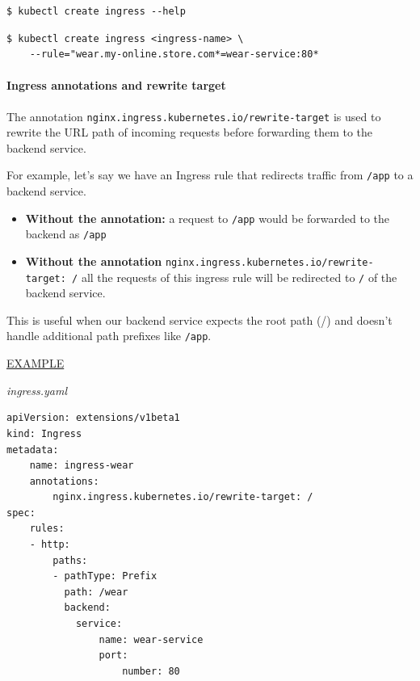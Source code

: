 \documentclass{article}
\newenvironment{codetemplate}[1][]{%
  \mybasecolorbox[#1]
  \itshape
}{%
  \endmybasecolorbox
}
\begin{document}
\begin{codetemplate}{}
\begin{verbatim}
$ kubectl create ingress --help
\end{verbatim}
\end{codetemplate}

\begin{codetemplate}{}
\begin{verbatim}
$ kubectl create ingress <ingress-name> \
    --rule="wear.my-online.store.com*=wear-service:80*
\end{verbatim}
\end{codetemplate}

\paragraph{Ingress annotations and rewrite target}
The annotation \verb|nginx.ingress.kubernetes.io/rewrite-target| is used to rewrite the URL path of incoming requests before forwarding them to the backend service.

For example, let's say we have an Ingress rule that redirects traffic from \verb|/app| to a backend service. 

\begin{itemize}
    \item \textbf{Without the annotation:} a request to \verb|/app| would be forwarded to the backend as \verb|/app|
    \item \textbf{Without the annotation} \verb|nginx.ingress.kubernetes.io/rewrite-target: /| all the requests of this ingress rule will be redirected to \verb|/| of the backend service.
\end{itemize}

This is useful when our backend service expects the root path (/) and doesn't handle 
additional path prefixes like \verb|/app|.

\underline{EXAMPLE}

\begin{codetemplate}{ingress.yaml}
\begin{verbatim}
apiVersion: extensions/v1beta1
kind: Ingress
metadata:
    name: ingress-wear
    annotations:
        nginx.ingress.kubernetes.io/rewrite-target: /
spec:
    rules:
    - http:
        paths:
        - pathType: Prefix
          path: /wear
          backend:
            service:
                name: wear-service
                port:
                    number: 80
\end{verbatim}
\end{codetemplate}
\end{document}
